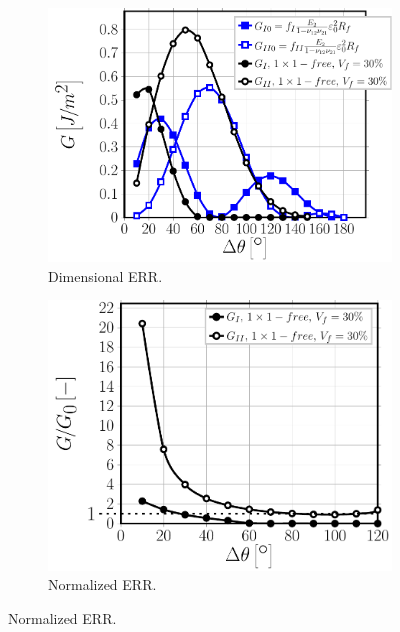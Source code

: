 \documentclass[review]{elsarticle}
\begin{document}
\begin{figure}[!h]
\centering
    \begin{subfigure}[b]{0.475\textwidth}
        \includegraphics[height=0.225\textheight]{comparescaling-Vf30.pdf}
        \caption{Dimensional ERR.}\label{subfig:comparescalingVf30}
    \end{subfigure} \quad
    \begin{subfigure}[b]{0.45\textwidth}
        \includegraphics[height=0.225\textheight]{comparescaling-Vf30-normalized.pdf}
        \caption{Normalized ERR.}\label{subfig:comparescalingVf30normalized}
    \end{subfigure}


\end{figure}
\end{document}
